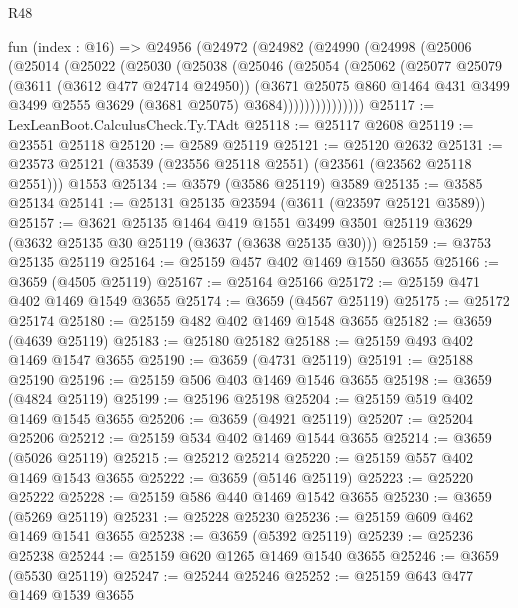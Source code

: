 \begin{lexlean}{R48}
\begin{coremodule}
    fun (index : @16) =>
    @24956
      (@24972
        (@24982
          (@24990
            (@24998
              (@25006
                (@25014
                  (@25022
                    (@25030
                      (@25038
                        (@25046
                          (@25054
                            (@25062
                              (@25077
                                @25079
                                (@3611 (@3612 @477 @24714 @24950))
                                (@3671
                                  @25075
                                  @860
                                  @1464
                                  @431
                                  @3499
                                  @3499
                                  @2555
                                  @3629
                                  (@3681 @25075)
                                  @3684)))))))))))))))
@25117 := LexLeanBoot.CalculusCheck.Ty.TAdt
@25118 := @25117 @2608
@25119 := @23551 @25118
@25120 := @2589 @25119
@25121 := @25120 @2632
@25131 := @23573 @25121 (@3539 (@23556 @25118 @2551) (@23561 (@23562 @25118 @2551))) @1553
@25134 := @3579 (@3586 @25119) @3589
@25135 := @3585 @25134
@25141 := @25131 @25135 @23594 (@3611 (@23597 @25121 @3589))
@25157 := @3621
    @25135
    @1464
    @419
    @1551
    @3499
    @3501
    @25119
    @3629
    (@3632 @25135 @30 @25119 (@3637 (@3638 @25135 @30)))
@25159 := @3753 @25135 @25119
@25164 := @25159 @457 @402 @1469 @1550 @3655
@25166 := @3659 (@4505 @25119)
@25167 := @25164 @25166
@25172 := @25159 @471 @402 @1469 @1549 @3655
@25174 := @3659 (@4567 @25119)
@25175 := @25172 @25174
@25180 := @25159 @482 @402 @1469 @1548 @3655
@25182 := @3659 (@4639 @25119)
@25183 := @25180 @25182
@25188 := @25159 @493 @402 @1469 @1547 @3655
@25190 := @3659 (@4731 @25119)
@25191 := @25188 @25190
@25196 := @25159 @506 @403 @1469 @1546 @3655
@25198 := @3659 (@4824 @25119)
@25199 := @25196 @25198
@25204 := @25159 @519 @402 @1469 @1545 @3655
@25206 := @3659 (@4921 @25119)
@25207 := @25204 @25206
@25212 := @25159 @534 @402 @1469 @1544 @3655
@25214 := @3659 (@5026 @25119)
@25215 := @25212 @25214
@25220 := @25159 @557 @402 @1469 @1543 @3655
@25222 := @3659 (@5146 @25119)
@25223 := @25220 @25222
@25228 := @25159 @586 @440 @1469 @1542 @3655
@25230 := @3659 (@5269 @25119)
@25231 := @25228 @25230
@25236 := @25159 @609 @462 @1469 @1541 @3655
@25238 := @3659 (@5392 @25119)
@25239 := @25236 @25238
@25244 := @25159 @620 @1265 @1469 @1540 @3655
@25246 := @3659 (@5530 @25119)
@25247 := @25244 @25246
@25252 := @25159 @643 @477 @1469 @1539 @3655

\end{coremodule}
\end{lexlean}
